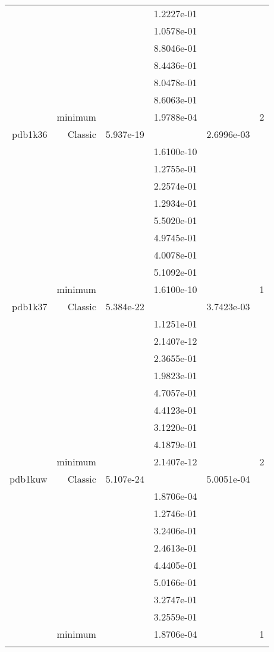 \begin{xltabular}{\textwidth}{r|rS[table-format=1.3e+2]S[table-format=1.4e+2]S[table-format=1.4e+2]S[table-format=-1.5]}
&  &  & 1.2227e-01 & & \\
&  &  & 1.0578e-01 & & \\
&  &  & 8.8046e-01 & & \\
&  &  & 8.4436e-01 & & \\
&  &  & 8.0478e-01 & & \\
&  &  & 8.6063e-01 & & \\
& minimum &  & 1.9788e-04 & & 2 \\  \addlinespace
pdb1k36 & Classic & 5.937e-19 &  & 2.6996e-03 & \\
&  &  & 1.6100e-10 & & \\
&  &  & 1.2755e-01 & & \\
&  &  & 2.2574e-01 & & \\
&  &  & 1.2934e-01 & & \\
&  &  & 5.5020e-01 & & \\
&  &  & 4.9745e-01 & & \\
&  &  & 4.0078e-01 & & \\
&  &  & 5.1092e-01 & & \\
& minimum &  & 1.6100e-10 & & 1 \\  \addlinespace
pdb1k37 & Classic & 5.384e-22 &  & 3.7423e-03 & \\
&  &  & 1.1251e-01 & & \\
&  &  & 2.1407e-12 & & \\
&  &  & 2.3655e-01 & & \\
&  &  & 1.9823e-01 & & \\
&  &  & 4.7057e-01 & & \\
&  &  & 4.4123e-01 & & \\
&  &  & 3.1220e-01 & & \\
&  &  & 4.1879e-01 & & \\
& minimum &  & 2.1407e-12 & & 2 \\  \addlinespace
pdb1kuw & Classic & 5.107e-24 &  & 5.0051e-04 & \\
&  &  & 1.8706e-04 & & \\
&  &  & 1.2746e-01 & & \\
&  &  & 3.2406e-01 & & \\
&  &  & 2.4613e-01 & & \\
&  &  & 4.4405e-01 & & \\
&  &  & 5.0166e-01 & & \\
&  &  & 3.2747e-01 & & \\
&  &  & 3.2559e-01 & & \\
& minimum &  & 1.8706e-04 & & 1 \\  \addlinespace

\end{xltabular}
